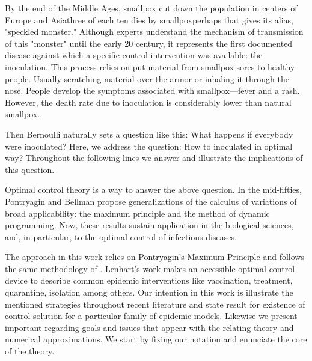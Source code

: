   By the end of the Middle Ages, smallpox cut down the 
population in centers of Europe and Asia\textemdash three of each ten dies by 
smallpox\textemdash perhaps that gives its alias, "speckled monster."  
Although experts understand the mechanism of transmission of this  "monster"
until the early 20  century, it represents the first documented disease
\citep[][]{bernoulli1760essai, bradley1971smallpox, Foppa2017} against which a
specific control intervention was available: the inoculation. This process
relies on put material from smallpox sores to healthy people. Usually scratching
material over the armor or inhaling it through the nose. People develop the
symptoms associated with smallpox---fever and a rash. However, the death rate
due to inoculation is considerably lower than natural smallpox.

  Then Bernoulli naturally sets a question like this: What happens if everybody
were inoculated? Here, we address the question: How to inoculated in optimal
way? Throughout the following lines we answer and illustrate the implications
of this question. 

  Optimal control theory is a way to answer the above question.  In the
mid-fifties, Pontryagin and Bellman propose generalizations of the calculus of
variations of broad applicability:  the maximum principle and the method of
dynamic programming. Now, these results sustain application in the
biological sciences, and, in particular, to the optimal control
of infectious diseases.

  The approach in this work relies on Pontryagin's Maximum
Principle \cite{Boltyanski1960} and follows the same methodology of
\citet{lenhart2007optimal}. Lenhart's work makes an accessible optimal control
device to describe common epidemic interventions like vaccination, treatment,
quarantine, isolation among others. Our intention in this work is illustrate
the mentioned strategies throughout recent literature and state result for
existence of control solution for a particular family of epidemic models.
Likewise we present  important regarding goals and issues that appear with the
relating theory and numerical approximations. We start by fixing our notation
and enunciate the core of the theory.

























